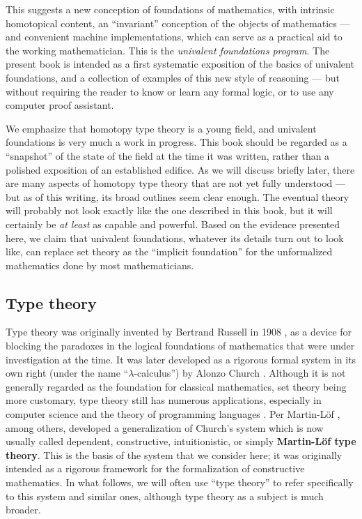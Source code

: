 This suggests a new conception of foundations of mathematics, with intrinsic homotopical content, an ``invariant'' conception of the objects of mathematics --- and convenient machine implementations, which can serve as a practical aid to the working mathematician.
This is the \emph{univalent foundations program}.
The present book is intended as a first systematic exposition of the basics of univalent foundations, and a collection of examples of this new style of reasoning --- but without requiring the reader to know or learn any formal logic, or to use any computer proof assistant.

We emphasize that homotopy type theory is a young field, and univalent foundations is very much a work in progress.
This book should be regarded as a ``snapshot'' of the state of the field at the time it was written, rather than a polished exposition of an established edifice.
As we will discuss briefly later, there are many aspects of homotopy type theory that are not yet fully understood --- but as of this writing, its broad outlines seem clear enough.
The eventual theory will probably not look exactly like the one described in this book, but it will certainly be \emph{at least} as capable and powerful.
Based on the evidence presented here, we claim that univalent foundations, whatever its details turn out to look like, can replace set theory as the ``implicit foundation'' for the unformalized mathematics done by most mathematicians.


\subsection*{Type theory}

Type theory was originally invented by Bertrand Russell in 1908 \cite{Russell:1908}, as a device for blocking the paradoxes in the logical foundations of mathematics  that were under investigation at the time. It was later developed as a rigorous formal system  in its own right (under the name ``$\lambda$-calculus'') by Alonzo Church \cite{Church:1933cl,Church:1940tu,Church:1941tc}.  Although it is not generally regarded as the foundation for classical mathematics, set theory being more customary, type theory still has numerous applications, especially in computer science and the theory of programming languages \cite{Pierce:2002tp}.   Per Martin-L\"{o}f \cite{MartinLof:1998tw,MartinLof:1975tb,MartinLof:1982bn,MartinLof:1984tr}, among others,
developed a generalization of Church's system which is now usually called dependent, constructive, intuitionistic, or simply {\bf Martin\--L\"of type theory}. This is the basis of the system that we consider here; it was originally intended as a rigorous framework for the formalization of constructive mathematics.  In what follows, we will often use ``type theory'' to refer specifically to this system and similar ones, although type theory as a subject is much broader.

